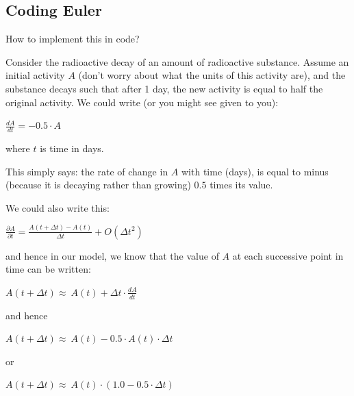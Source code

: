 \documentclass{tufte-book} %
\begin{document}

\subsection*{Coding Euler}

How to implement this in code?

Consider the radioactive decay of an amount of radioactive substance. Assume an initial activity \(A\) (don't worry about what the units of this activity are), and the substance decays such that after 1 day, the new activity is equal to half the original activity. We could write (or you might see given to you):

\vspace{2mm}
\(\frac{dA}{dt}=-0.5\cdot A\)
\vspace{2mm}

\noindent where \(t\) is time in days. 

This simply says: the rate of change in \(A\) with time (days), is equal to minus (because it is decaying rather than growing) \(0.5\) times its value.

\newpage 

\noindent We could also write this:

\vspace{2mm}\(
\frac{\partial A}{\partial t} = \frac{A(t+\Delta t)-A(t)}{\Delta t} + O(\Delta t^{2})
\)\vspace{2mm}

\noindent and hence in our model, we know that the value of \(A\) at each successive point in time can be written:

\vspace{2mm}\(
A(t+\Delta t) \approx\ A(t) + \Delta t\cdot\frac{dA}{dt}
\)\vspace{2mm}

\noindent and hence

\vspace{2mm}\(
A(t+\Delta t) \approx\ A(t) -0.5\cdot A(t) \cdot \Delta t
\)\vspace{2mm}

\noindent or

\vspace{2mm}\(
A(t+\Delta t) \approx\ A(t)\cdot(1.0-0.5\cdot \Delta t)
\)\vspace{2mm}
\end{document}
